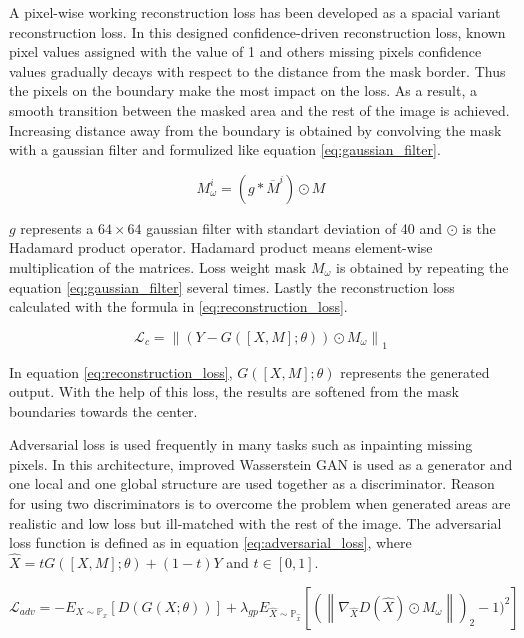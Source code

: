 A pixel-wise working reconstruction loss has been developed as a spacial variant reconstruction loss. In this designed confidence-driven reconstruction loss, known pixel values assigned with the value of 1 and others missing pixels confidence values gradually decays with respect to the distance from the mask border. Thus the pixels on the boundary make the most impact on the loss. As a result, a smooth transition between the masked area and the rest of the image is achieved. Increasing distance away from the boundary is obtained by convolving the mask with a gaussian filter and formulized like equation \ref{eq:gaussian_filter}.

\begin{equation}
    M_{\omega}^{i} = (g \ast \overline{M}^{i}) \odot M
    \label{eq:gaussian_filter}
\end{equation}

\(g\) represents a \(64 \times 64\) gaussian filter with standart deviation of 40 and \(\odot\) is the Hadamard product operator. Hadamard product means element-wise multiplication of the matrices. Loss weight mask \(M_{\omega}\) is obtained by repeating the equation \ref{eq:gaussian_filter} several times. Lastly the reconstruction loss calculated with the formula in \ref{eq:reconstruction_loss}.

\begin{equation}
    \mathcal{L}_{c} = \left \| (Y - G([X, M]; \theta )) \odot M_{\omega} \right \|_{1}
    \label{eq:reconstruction_loss}
\end{equation}

In equation \ref{eq:reconstruction_loss}, \(G([X, M]; \theta )\) represents the generated output. With the help of this loss, the results are softened from the mask boundaries towards the center.

Adversarial loss is used frequently in many tasks such as inpainting missing pixels. In this architecture, improved Wasserstein GAN \cite{improved_train_wgan} is used as a generator and one local and one global structure are used together as a discriminator. Reason for using two discriminators is to overcome the problem when generated areas are realistic and low loss but ill-matched with the rest of the image. The adversarial loss function is defined as in equation \ref{eq:adversarial_loss}, where \(\widehat{X} = tG([X, M]; \theta) + (1 - t) Y\) and \(t \in [0, 1]\).

\begin{equation}
    \mathcal{L}_{adv} = - E_{X \sim \mathbb{P}_{x}}[D(G(X;\theta))] + \lambda_{gp} E_{\widehat{X} \sim \mathbb{P}_{\widehat{x}}}[(\left \| \nabla_{\widehat{X}} D(\widehat{X}) \odot M_{\omega} \right \|)_{2} - 1)^{2}]
    \label{eq:adversarial_loss}
\end{equation}

